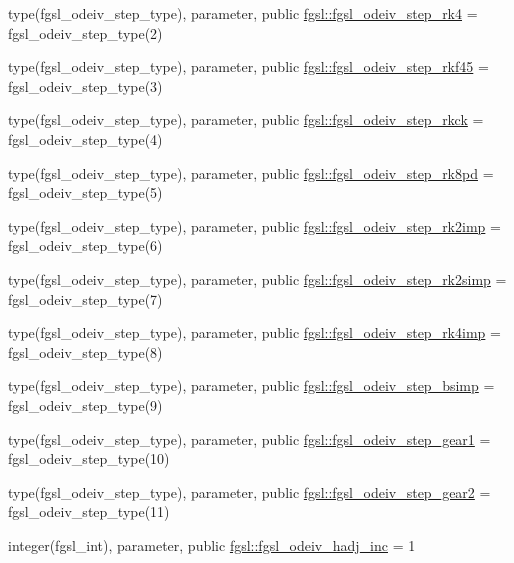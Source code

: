 \begin{DoxyCompactItemize}
type(fgsl\+\_\+odeiv\+\_\+step\+\_\+type), parameter, public \hyperlink{namespacefgsl_a466a47d91e65ed8da5395e1e1cb53a2c}{fgsl\+::fgsl\+\_\+odeiv\+\_\+step\+\_\+rk4} = fgsl\+\_\+odeiv\+\_\+step\+\_\+type(2)
\item 
type(fgsl\+\_\+odeiv\+\_\+step\+\_\+type), parameter, public \hyperlink{namespacefgsl_ad73c3dd0c5faf790ac4fe7c6bdfe0b75}{fgsl\+::fgsl\+\_\+odeiv\+\_\+step\+\_\+rkf45} = fgsl\+\_\+odeiv\+\_\+step\+\_\+type(3)
\item 
type(fgsl\+\_\+odeiv\+\_\+step\+\_\+type), parameter, public \hyperlink{namespacefgsl_a0c2cde787f3c705f883a74b1be126952}{fgsl\+::fgsl\+\_\+odeiv\+\_\+step\+\_\+rkck} = fgsl\+\_\+odeiv\+\_\+step\+\_\+type(4)
\item 
type(fgsl\+\_\+odeiv\+\_\+step\+\_\+type), parameter, public \hyperlink{namespacefgsl_a104f6eb85d1676e32d4aa0a93531ef61}{fgsl\+::fgsl\+\_\+odeiv\+\_\+step\+\_\+rk8pd} = fgsl\+\_\+odeiv\+\_\+step\+\_\+type(5)
\item 
type(fgsl\+\_\+odeiv\+\_\+step\+\_\+type), parameter, public \hyperlink{namespacefgsl_a0352c460177df9a983fc5984dd5be04a}{fgsl\+::fgsl\+\_\+odeiv\+\_\+step\+\_\+rk2imp} = fgsl\+\_\+odeiv\+\_\+step\+\_\+type(6)
\item 
type(fgsl\+\_\+odeiv\+\_\+step\+\_\+type), parameter, public \hyperlink{namespacefgsl_aba1fcb32d594f9bfa4e3d81e79ea8bff}{fgsl\+::fgsl\+\_\+odeiv\+\_\+step\+\_\+rk2simp} = fgsl\+\_\+odeiv\+\_\+step\+\_\+type(7)
\item 
type(fgsl\+\_\+odeiv\+\_\+step\+\_\+type), parameter, public \hyperlink{namespacefgsl_ac3387d8df1b6ef380e912fcb3a852d2b}{fgsl\+::fgsl\+\_\+odeiv\+\_\+step\+\_\+rk4imp} = fgsl\+\_\+odeiv\+\_\+step\+\_\+type(8)
\item 
type(fgsl\+\_\+odeiv\+\_\+step\+\_\+type), parameter, public \hyperlink{namespacefgsl_a64196b17cea8ee47b1386de3b5c3186e}{fgsl\+::fgsl\+\_\+odeiv\+\_\+step\+\_\+bsimp} = fgsl\+\_\+odeiv\+\_\+step\+\_\+type(9)
\item 
type(fgsl\+\_\+odeiv\+\_\+step\+\_\+type), parameter, public \hyperlink{namespacefgsl_adc37c503cd35373720d2238db569e06a}{fgsl\+::fgsl\+\_\+odeiv\+\_\+step\+\_\+gear1} = fgsl\+\_\+odeiv\+\_\+step\+\_\+type(10)
\item 
type(fgsl\+\_\+odeiv\+\_\+step\+\_\+type), parameter, public \hyperlink{namespacefgsl_ac5f41836ce32fc0099426b20ac83966c}{fgsl\+::fgsl\+\_\+odeiv\+\_\+step\+\_\+gear2} = fgsl\+\_\+odeiv\+\_\+step\+\_\+type(11)
\item 
integer(fgsl\+\_\+int), parameter, public \hyperlink{namespacefgsl_a6af547b616e922df4bf6658c0199307d}{fgsl\+::fgsl\+\_\+odeiv\+\_\+hadj\+\_\+inc} = 1

\end{DoxyCompactItemize}
